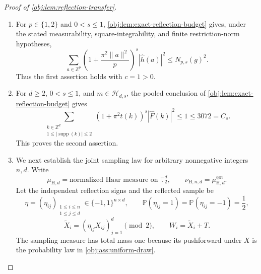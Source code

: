 \documentclass[11pt]{article}
\begin{document}
\begin{proof}[Proof of \cref{obj:lem:reflection-transfer}]
\begin{enumerate}
\item For \(p\in\{1,2\}\) and \(0<s\leq1\), \cref{obj:lem:exact-reflection-budget} gives, under the stated measurability, square-integrability, and finite restriction-norm hypotheses,
\[
\sum_{a\in\mathbb Z^p}
\left(1+\frac{\pi^2\|a\|^2}{p}\right)^s
|\widehat h(a)|^2
\leq N_{p,s}(g)^2.
\]
Thus the first assertion holds with \(c=1>0\).

\item For \(d\geq2\), \(0<s\leq1\), and
\(m\in\mathcal H_{d,s}\), the pooled conclusion of
\cref{obj:lem:exact-reflection-budget} gives
\[
\sum_{\substack{k\in\mathbb Z^d\\
1\leq|\operatorname{supp}(k)|\leq2}}
(1+\pi^2t(k))^s|\widehat F(k)|^2
\leq1\leq3072=C_s.
\]
This proves the second assertion.

\item We next establish the joint sampling law for arbitrary nonnegative
integers \(n,d\). Write
\[
\mu_{\mathrm H,d}
=\text{normalized Haar measure on }\mathbb T_2^d,
\qquad
\nu_{\mathrm H,n,d}=\mu_{\mathrm H,d}^{\otimes n}.
\]
Let the independent reflection signs and the reflected sample be
\[
\eta=(\eta_{ij})_{\substack{1\leq i\leq n\\1\leq j\leq d}}
\in\{-1,1\}^{n\times d},
\qquad
\mathbb P(\eta_{ij}=1)=\mathbb P(\eta_{ij}=-1)=\frac12,
\]
\[
\widetilde X_i=(\eta_{ij}X_{ij})_{j=1}^d
\pmod{2},
\qquad
W_i=\widetilde X_i+T.
\]
The sampling measure has total mass one because its pushforward under
\(X\) is the probability law in \cref{obj:ass:uniform-draw}.


\end{enumerate}
\end{proof}
\end{document}
